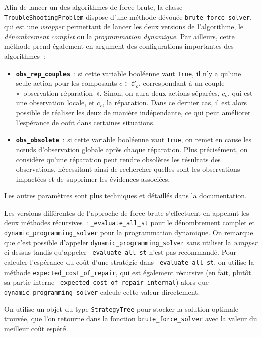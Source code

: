 \documentclass[a4paper,11pt]{article}
\theoremstyle{plain}
\theoremstyle{definition}
\begin{document}
Afin de lancer un des algorithmes de force brute, la classe \texttt{TroubleShootingProblem} dispose d'une méthode dévouée \texttt{brute\_force\_solver}, qui est une \emph{wrapper} permettant de lancer les deux versions de l'algorithme, le \emph{dénombrement complet} ou la \emph{programmation dynamique}. Par ailleurs, cette méthode prend également en argument des configurations importantes des algorithmes~:
\begin{itemize}
    \item \texttt{\textbf{obs\_rep\_couples}}~: si cette variable booléenne vaut \texttt{True}, il n'y a qu'une seule action pour les composants $c \in \mathcal C_o$, correspondant à un couple «~observation-réparation~». Sinon, on aura deux actions séparées, $c_o$, qui est une observation locale, et $c_r$, la réparation. Dans ce dernier cas, il est alors possible de réaliser les deux de manière indépendante, ce qui peut améliorer l'espérance de coût dans certaines situations.	
    \item \texttt{\textbf{obs\_obsolete}}~: si cette variable booléenne vaut \texttt{True}, on remet en cause les nœuds d'observation globale après chaque réparation. Plus précisément, on considère qu'une réparation peut rendre obsolètes les résultats des observations, nécessitant ainsi de rechercher quelles sont les observations impactées et de supprimer les évidences associées.
\end{itemize}
Les autres paramètres sont plus techniques et détaillés dans la documentation.

Les versions différentes de l'approche de force brute s'effectuent en appelant les deux méthodes récursives~: \texttt{\_evaluate\_all\_st} pour le dénombrement complet et \texttt{dynamic\_programming\allowbreak{}\_solver} pour la programmation dynamique. On remarque que c'est possible d'appeler \texttt{dynamic\_programming\_solver} sans utiliser la \emph{wrapper} ci-dessus tandis qu'appeler \texttt{\_evaluate\_all\_st} n'est pas recommandé. Pour calculer l'espérance du coût d'une stratégie dans \texttt{\_evaluate\_all\_st}, on utilise la méthode \texttt{expected\_cost\_of\_repair}, qui est également récursive (en fait, plutôt sa partie interne \texttt{\_expected\_cost\_of\_repair\_internal}) alors que \texttt{dynamic\_programming\_solver} calcule cette valeur directement.

On utilise un objet du type \texttt{StrategyTree} pour stocker la solution optimale trouvée, que l'on retourne dans la fonction \texttt{brute\_force\_solver} avec la valeur du meilleur coût espéré.
\end{document}
